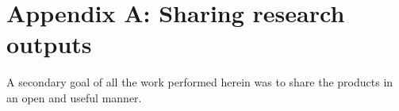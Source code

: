 \chapter*{Appendix A: Sharing research outputs}

A secondary goal of all the work performed herein was to share the products in
an open and useful manner.